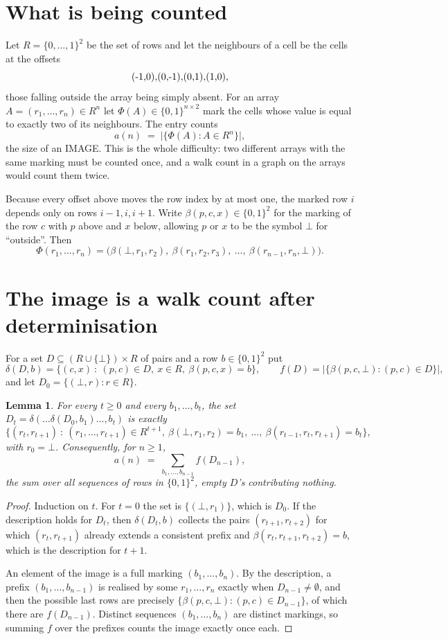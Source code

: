 \documentclass[11pt,a4paper]{article}
\theoremstyle{plain}
\newtheorem{lemma}[theorem]{Lemma}
\theoremstyle{definition}
\begin{document}
\section{What is being counted}

Let $R=\{0,\dots,1\}^{2}$ be the set of rows and let the neighbours of a cell be the
cells at the offsets
\[
$(-1,0)$, $(0,-1)$, $(0,1)$, $(1,0)$,
\]
those falling outside the array being simply absent. For an array
$A=(r_1,\dots,r_n)\in R^n$ let $\Phi(A)\in\{0,1\}^{n\times2}$ mark the cells whose value
is equal to exactly two of its neighbours. The entry counts
\[
a(n)\;=\;\bigl|\{\Phi(A):A\in R^n\}\bigr| ,
\]
the size of an IMAGE. This is the whole difficulty: two different arrays with the same marking
must be counted once, and a walk count in a graph on the arrays would count them twice.

Because every offset above moves the row index by at most one, the marked row $i$ depends only
on rows $i-1,i,i+1$. Write $\beta(p,c,x)\in\{0,1\}^{2}$ for the marking of the row $c$
with $p$ above and $x$ below, allowing $p$ or $x$ to be the symbol $\bot$ for ``outside''.
Then
\[
\Phi(r_1,\dots,r_n)=\bigl(\beta(\bot,r_1,r_2),\ \beta(r_1,r_2,r_3),\ \dots,\
\beta(r_{n-1},r_n,\bot)\bigr).
\]

\section{The image is a walk count after determinisation}

For a set $D\subseteq(R\cup\{\bot\})\times R$ of pairs and a row $b\in\{0,1\}^{2}$ put
\[
\delta(D,b)=\{(c,x)\ :\ (p,c)\in D,\ x\in R,\ \beta(p,c,x)=b\},\qquad
f(D)=\bigl|\{\beta(p,c,\bot):(p,c)\in D\}\bigr| ,
\]
and let $D_0=\{(\bot,r):r\in R\}$.

\begin{lemma}\label{lem:det}
For every $t\ge0$ and every $b_1,\dots,b_t$, the set
$D_t=\delta(\dots\delta(D_0,b_1)\dots,b_t)$ is exactly
\[
\{(r_t,r_{t+1})\ :\ (r_1,\dots,r_{t+1})\in R^{t+1},\ \beta(\bot,r_1,r_2)=b_1,\ \dots,\
\beta(r_{t-1},r_t,r_{t+1})=b_t\} ,
\]
with $r_0=\bot$. Consequently, for $n\ge1$,
\[
a(n)\;=\;\sum_{b_1,\dots,b_{n-1}}f(D_{n-1}),
\]
the sum over all sequences of rows in $\{0,1\}^{2}$, empty $D$'s contributing nothing.
\end{lemma}

\begin{proof}
Induction on $t$. For $t=0$ the set is $\{(\bot,r_1)\}$, which is $D_0$. If the description
holds for $D_t$, then $\delta(D_t,b)$ collects the pairs $(r_{t+1},r_{t+2})$ for which
$(r_t,r_{t+1})$ already extends a consistent prefix and
$\beta(r_t,r_{t+1},r_{t+2})=b$, which is the description for $t+1$.

An element of the image is a full marking $(b_1,\dots,b_n)$. By the description, a prefix
$(b_1,\dots,b_{n-1})$ is realised by some $r_1,\dots,r_n$ exactly when $D_{n-1}\neq
\emptyset$, and then the possible last rows are precisely
$\{\beta(p,c,\bot):(p,c)\in D_{n-1}\}$, of which there are $f(D_{n-1})$. Distinct
sequences $(b_1,\dots,b_n)$ are distinct markings, so summing $f$ over the prefixes counts the
image exactly once each.
\end{proof}
\end{document}
